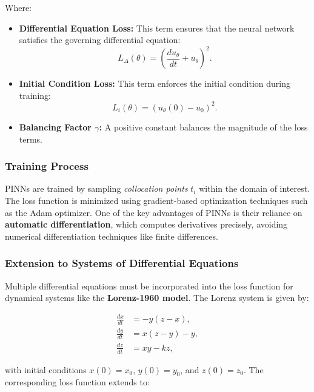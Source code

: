 \documentclass{article}
\begin{document}
Where:

\begin{itemize}
    \item \textbf{Differential Equation Loss:} This term ensures that the neural network satisfies the governing differential equation:
    \begin{equation}
        L_{\Delta}(\theta) = \left( \frac{du_{\theta}}{dt} + u_{\theta} \right)^2.
    \end{equation}
    \item \textbf{Initial Condition Loss:} This term enforces the initial condition during training:
    \begin{equation}
        L_{i}(\theta) = \left( u_{\theta}(0) - u_0 \right)^2.
    \end{equation}
    \item \textbf{Balancing Factor $\gamma$:} A positive constant balances the magnitude of the loss terms.
\end{itemize}

\subsubsection{Training Process}
PINNs are trained by sampling \textit{collocation points} $t_i$ within the domain of interest. The loss function is minimized using gradient-based optimization techniques such as the Adam optimizer. One of the key advantages of PINNs is their reliance on \textbf{automatic differentiation}, which computes derivatives precisely, avoiding numerical differentiation techniques like finite differences.

\subsubsection{Extension to Systems of Differential Equations}
Multiple differential equations must be incorporated into the loss function for dynamical systems like the \textbf{Lorenz-1960 model}. The Lorenz system is given by:

\begin{equation}
    \begin{aligned}
        \frac{dx}{dt} &= -y(z - x), \\
        \frac{dy}{dt} &= x(z - y) - y, \\
        \frac{dz}{dt} &= xy - kz,
    \end{aligned}
\end{equation}

with initial conditions $x(0) = x_0$, $y(0) = y_0$, and $z(0) = z_0$. The corresponding loss function extends to:
\end{document}

